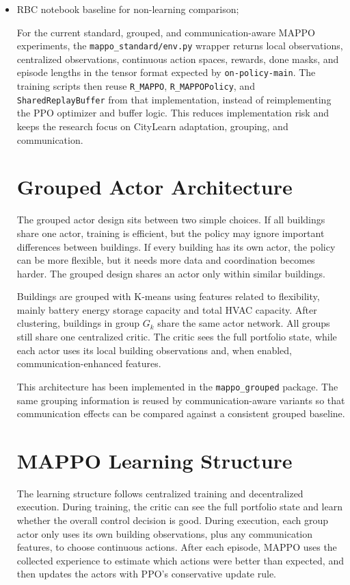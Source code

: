 \begin{itemize}
  \item RBC notebook baseline for non-learning comparison;

For the current standard, grouped, and communication-aware MAPPO experiments,
the \texttt{mappo\_standard/env.py} wrapper returns local observations,
centralized observations, continuous action spaces, rewards, done masks, and
episode lengths in the tensor format expected by \texttt{on-policy-main}. The
training scripts then reuse \texttt{R\_MAPPO}, \texttt{R\_MAPPOPolicy}, and
\texttt{SharedReplayBuffer} from that implementation, instead of reimplementing
the PPO optimizer and buffer logic. This reduces implementation risk and keeps
the research focus on CityLearn adaptation, grouping, and communication.

\section{Grouped Actor Architecture}

The grouped actor design sits between two simple choices. If all buildings share
one actor, training is efficient, but the policy may ignore important
differences between buildings. If every building has its own actor, the policy
can be more flexible, but it needs more data and coordination becomes harder.
The grouped design shares an actor only within similar buildings.

Buildings are grouped with K-means using features related to flexibility, mainly
battery energy storage capacity and total HVAC capacity. After clustering,
buildings in group $G_k$ share the same actor network. All groups still share one
centralized critic. The critic sees the full portfolio state, while each actor
uses its local building observations and, when enabled, communication-enhanced
features.

This architecture has been implemented in the \texttt{mappo\_grouped} package.
The same grouping information is reused by communication-aware variants so that
communication effects can be compared against a consistent grouped baseline.

\section{MAPPO Learning Structure}

The learning structure follows centralized training and decentralized
execution. During training, the critic can see the full portfolio state and
learn whether the overall control decision is good. During execution, each
group actor only uses its own building observations, plus any communication
features, to choose continuous actions. After each episode, MAPPO uses the
collected experience to estimate which actions were better than expected, and
then updates the actors with PPO's conservative update rule.


\end{itemize}
